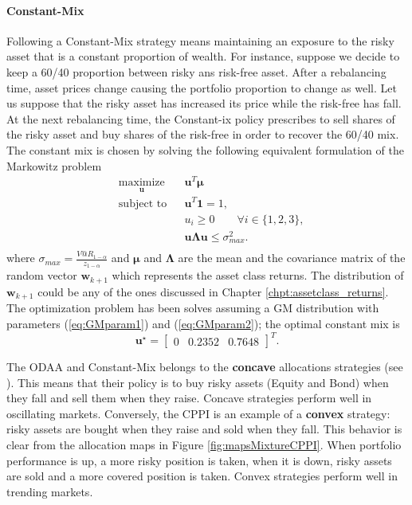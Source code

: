 \paragraph{Constant-Mix}
Following a Constant-Mix strategy means maintaining an exposure to the risky asset that is a constant proportion of wealth. For instance, suppose we decide to keep a 60/40 proportion between risky ans risk-free asset. After a rebalancing time, asset prices change causing the portfolio proportion to change as well. Let us suppose that the risky asset has increased its price while the risk-free has fall. At the next rebalancing time, the Constant-ix policy prescribes to sell shares of the risky asset and buy shares of the risk-free in order to recover the 60/40 mix. The constant mix is chosen by solving the following equivalent formulation of the Markowitz problem
\begin{equation*}
\begin{aligned}
& \underset{\bm{u}}{\text{maximize}} & &  \bm{u}^T\bm{\mu} \\
& \text{subject to} & & \bm{u}^T\bm{1}=1, \\
& & & u_i \geq 0 \qquad \forall i \in \{1,2,3\},\\
& & &\bm{u}\bm{\Lambda}\bm{u} \leq \sigma_{max}^2.\\
\end{aligned}
\end{equation*}
where $\sigma_{max}=\frac{V@R_{1-\alpha}}{z_{1-\alpha}}$ and $\bm{\mu}$ and $\bm{\Lambda}$ are the mean and the covariance matrix of the random vector $\bm{w}_{k+1}$ which represents the asset class returns.
The distribution of $\bm{w}_{k+1}$ could be any of the ones discussed in Chapter \ref{chpt:assetclass_returns}. The optimization problem has been solves assuming a GM distribution with parameters (\ref{eq:GMparam1}) and (\ref{eq:GMparam2}); the optimal constant mix is
\[ \bm{u}^{\star} = \begin{bmatrix} 0 & 0.2352 & 0.7648 \end{bmatrix}^T.\]


The ODAA and Constant-Mix belongs to the \textbf{concave} allocations strategies (see \cite{Plasse2013}). This means that their policy is to buy risky assets (Equity and Bond) when they fall and sell them when they raise. Concave strategies perform well in oscillating markets. Conversely, the \gls{CPPI} is an example of a \textbf{convex} strategy: risky assets are bought when they raise and sold when they fall. This behavior is clear from the allocation maps in Figure \ref{fig:mapsMixtureCPPI}. When portfolio performance is up, a more risky position is taken, when it is down, risky assets are sold and a more covered position is taken. Convex strategies perform well in trending markets.

